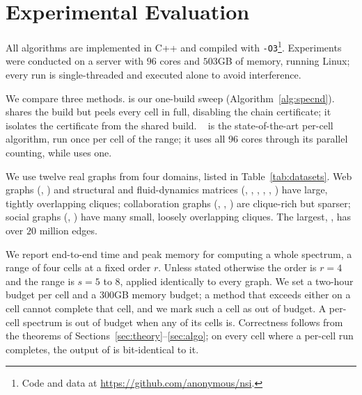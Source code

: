 \section{Experimental Evaluation}
\label{sec:exp}

All algorithms are implemented in C++ and compiled with \texttt{-O3}\footnote{Code and data at \url{https://github.com/anonymous/nsi}.}.
%
Experiments were conducted on a server with $96$ cores and $503$GB of memory, running Linux; every run is single-threaded and executed alone to avoid interference.

We compare three methods.
%
\specnd{} is our one-build sweep (Algorithm~\ref{alg:specnd}).
%
\specndbase{} shares the build but peels every cell in full, disabling the chain certificate; it isolates the certificate from the shared build.
%
\cnd~\cite{LocalNuclear} is the state-of-the-art per-cell algorithm, run once per cell of the range; it uses all $96$ cores through its parallel counting, while \specnd{} uses one.

We use twelve real graphs from four domains, listed in Table~\ref{tab:datasets}.
%
Web graphs (\daWIT, \daWUK) and structural and fluid-dynamics matrices (\daPKa, \daPWT, \daLDR, \daRAE, \daPKb, \daNAS) have large, tightly overlapping cliques; collaboration graphs (\daDBL, \daAST, \daHEP) are clique-rich but sparser; social graphs (\daEPN, \daYTB) have many small, loosely overlapping cliques.
%
The largest, \daLDR, has over $20$ million edges.

We report end-to-end time and peak memory for computing a whole spectrum, a range of four cells at a fixed order $r$.
%
Unless stated otherwise the order is $r{=}4$ and the range is $s{=}5$ to $8$, applied identically to every graph.
%
We set a two-hour budget per cell and a $300$GB memory budget; a method that exceeds either on a cell cannot complete that cell, and we mark such a cell as out of budget.
%
A per-cell spectrum is out of budget when any of its cells is.
%
Correctness follows from the theorems of Sections~\ref{sec:theory}--\ref{sec:algo}; on every cell where a per-cell run completes, the output of \specnd{} is bit-identical to it.

